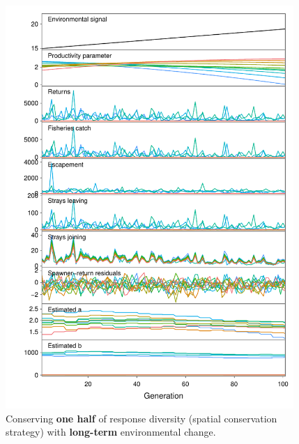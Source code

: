 \begin{figure}[htbp]
\centering
\includegraphics[width=4.3in]{metafolio/spatial-linear-sim-onehalf}
\caption{Conserving \textbf{one half} of response diversity (spatial
conservation strategy) with \textbf{long-term} environmental change.}
\label{f:eg-sp-linear-half}
\end{figure}

\clearpage

